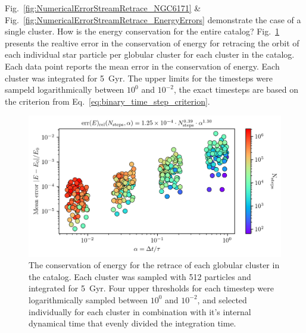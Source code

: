        Fig.~\ref{fig:NumericalErrorStreamRetrace_NGC6171} \& Fig.~\ref{fig:NumericalErrorStreamRetrace_EnergyErrors} demonstrate the case of a single cluster. How is the energy conservation for the entire catalog? Fig.~\ref{fig:NumericalErrorStreamRetraceEnergyConservation} presents the realtive error in the conservation of energy for retracing the orbit of each individual star particle per globular cluster for each cluster in the catalog. Each data point reports the mean error in the conservation of energy. Each cluster was integrated for 5~Gyr. The upper limits for the timesteps were sampeld logarithmically between $10^{0}$ and $10^{-2}$, the exact timesteps are based on the criterion from Eq.~\ref{eq:binary_time_step_criterion}.

        \begin{figure}
            \centering 
            \includegraphics[width=\linewidth]{images/NumericalErrorStreamRetraceEnergyConservation.png}
            \caption{The conservation of energy for the retrace of each globular cluster in the catalog. Each cluster was sampled with 512 particles and integrated for 5~Gyr. Four upper thresholds for each timestep were logarithmically sampled between $10^{0}$ and $10^{-2}$, and selected individually for each cluster in combination with it's internal dynamical time that evenly divided the integration time. }
            \label{fig:NumericalErrorStreamRetraceEnergyConservation}
        \end{figure}

